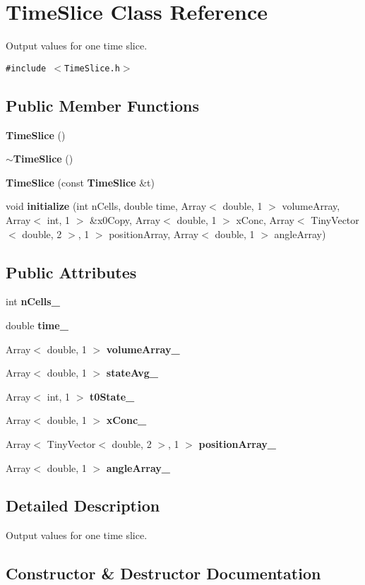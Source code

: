 \section{TimeSlice Class Reference}
\label{classTimeSlice}
Output values for one time slice.  


{\tt \#include $<$TimeSlice.h$>$}

\subsection*{Public Member Functions}
\begin{CompactItemize}
\item 
{\bf TimeSlice} ()
\item 
{\bf $\sim$TimeSlice} ()
\item 
{\bf TimeSlice} (const {\bf TimeSlice} \&t)
\item 
void {\bf initialize} (int nCells, double time, Array$<$ double, 1 $>$ volumeArray, Array$<$ int, 1 $>$ \&x0Copy, Array$<$ double, 1 $>$ xConc, Array$<$ TinyVector$<$ double, 2 $>$, 1 $>$ positionArray, Array$<$ double, 1 $>$ angleArray)
\end{CompactItemize}
\subsection*{Public Attributes}
\begin{CompactItemize}
\item 
int {\bf nCells\_\-}
\item 
double {\bf time\_\-}
\item 
Array$<$ double, 1 $>$ {\bf volumeArray\_\-}
\item 
Array$<$ double, 1 $>$ {\bf stateAvg\_\-}
\item 
Array$<$ int, 1 $>$ {\bf t0State\_\-}
\item 
Array$<$ double, 1 $>$ {\bf xConc\_\-}
\item 
Array$<$ TinyVector$<$ double, 2 $>$, 1 $>$ {\bf positionArray\_\-}
\item 
Array$<$ double, 1 $>$ {\bf angleArray\_\-}
\end{CompactItemize}


\subsection{Detailed Description}
Output values for one time slice. 

\subsection{Constructor \& Destructor Documentation}
